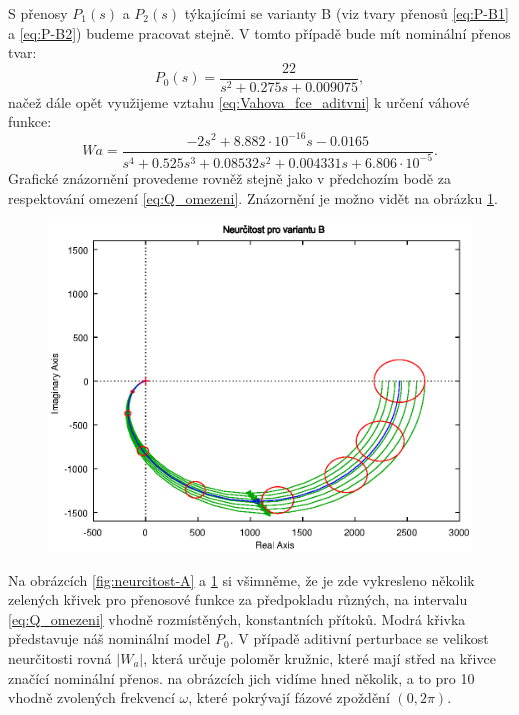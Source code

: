 \documentclass[a4paper,11pt]{article}
\begin{document}
S přenosy $ P_{1}\left ( s \right ) $ a $ P_{2}\left ( s \right ) $ týkajícími se varianty B (viz tvary přenosů \ref{eq:P-B1} a \ref{eq:P-B2}) budeme pracovat stejně. V tomto případě bude mít nominální přenos tvar:
\begin{equation}\label{eq:P-B0} 
P_{0}\left ( s \right ) =\frac{22}{s^{2} + 0.275 s + 0.009075},
\end{equation}
načež dále opět využijeme vztahu \ref{eq:Vahova_fce_aditvni} k určení váhové funkce:
\begin{equation}\label{eq:Wa-B}
Wa = \frac{-2s^{2} + 8.882\cdot 10^{-16}s - 0.0165}{s^{4} + 0.525 s^{3} + 0.08532 s^{2} + 0.004331 s + 6.806\cdot 10^{-5}}.
\end{equation}
Grafické znázornění provedeme rovněž stejně jako v předchozím bodě za respektování omezení \ref{eq:Q_omezeni}. Znázornění je možno vidět na obrázku \ref{fig:neurcitost-B}.
\begin{figure}[htbp]
	\begin{center}
	\includegraphics[scale = 1.0]{obrazky/neurcitostB.eps}
	\label{fig:neurcitost-B}
	\end{center}
\end{figure}

\newpage
Na obrázcích \ref{fig:neurcitost-A} a \ref{fig:neurcitost-B} si všimněme, že je zde vykresleno několik zelených křivek pro přenosové funkce za předpokladu různých, na intervalu \ref{eq:Q_omezeni} vhodně rozmístěných, konstantních přítoků. Modrá křivka představuje náš nominální model $ P_{0} $. V případě aditivní perturbace se velikost neurčitosti rovná $ \left | W_{a} \right | $, která určuje poloměr kružnic, které mají střed na křivce značící nominální přenos. na obrázcích jich vidíme hned několik, a to pro 10 vhodně zvolených frekvencí $ \omega $, které pokrývají fázové zpoždění $ \left ( 0, 2\pi  \right ) $.
\end{document}
